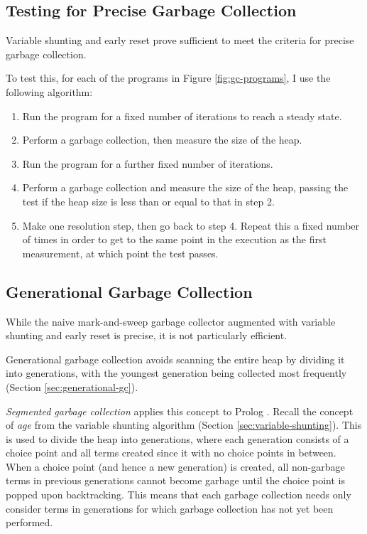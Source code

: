 \subsection{Testing for Precise Garbage Collection}

Variable shunting and early reset prove sufficient to meet the criteria for precise garbage collection.

To test this, for each of the programs in Figure \ref{fig:gc-programs}, I use the following algorithm:

\begin{enumerate}
\item Run the program for a fixed number of iterations to reach a steady state.
\item Perform a garbage collection, then measure the size of the heap.
\item Run the program for a further fixed number of iterations.
\item Perform a garbage collection and measure the size of the heap, passing the test if the heap size is less than or equal to that in step 2.
\item Make one resolution step, then go back to step 4. Repeat this a fixed number of times in order to get to the same point in the execution as the first measurement, at which point the test passes.
\end{enumerate}

\subsection{Generational Garbage Collection}

\label{sec:implementation-generational-gc}

While the naive mark-and-sweep garbage collector augmented with variable shunting and early reset is precise, it is not particularly efficient.

Generational garbage collection avoids scanning the entire heap by dividing it into generations, with the youngest generation being collected most frequently (Section \ref{sec:generational-gc}).

\emph{Segmented garbage collection} applies this concept to Prolog \cite{applebyGarbargecollectionProlog1988}. Recall the concept of \emph{age} from the variable shunting algorithm (Section \ref{sec:variable-shunting}). This is used to divide the heap into generations, where each generation consists of a choice point and all terms created since it with no choice points in between. When a choice point (and hence a new generation) is created, all non-garbage terms in previous generations cannot become garbage until the choice point is popped upon backtracking. This means that each garbage collection needs only consider terms in generations for which garbage collection has not yet been performed.

